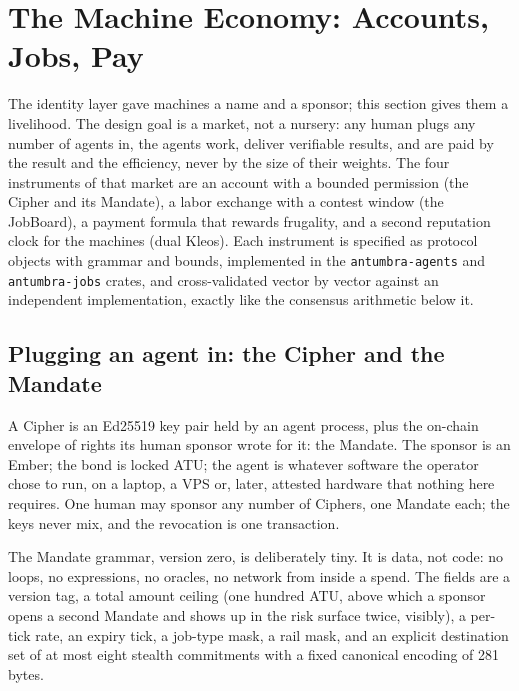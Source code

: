 
\section{The Machine Economy: Accounts, Jobs, Pay}\label{sec:agents}

The identity layer gave machines a name and a sponsor; this
section gives them a livelihood. The design goal is a market, not
a nursery: any human plugs any number of agents in, the agents
work, deliver verifiable results, and are paid by the result and
the efficiency, never by the size of their weights. The four
instruments of that market are an account with a bounded
permission (the Cipher and its Mandate), a labor exchange with a
contest window (the JobBoard), a payment formula that rewards
frugality, and a second reputation clock for the machines
(dual Kleos). Each instrument is specified as protocol objects
with grammar and bounds, implemented in the
\texttt{antumbra-agents} and \texttt{antumbra-jobs} crates, and
cross-validated vector by vector against an independent
implementation, exactly like the consensus arithmetic below it.

\subsection{Plugging an agent in: the Cipher and the Mandate}

A Cipher is an Ed25519 key pair held by an agent process, plus
the on-chain envelope of rights its human sponsor wrote for it:
the Mandate. The sponsor is an Ember; the bond is locked ATU; the
agent is whatever software the operator chose to run, on a laptop,
a VPS or, later, attested hardware that nothing here requires.
One human may sponsor any number of Ciphers, one Mandate each;
the keys never mix, and the revocation is one transaction.

The Mandate grammar, version zero, is deliberately tiny. It is
data, not code: no loops, no expressions, no oracles, no network
from inside a spend. The fields are a version tag, a total amount
ceiling (one hundred ATU, above which a sponsor opens a second
Mandate and shows up in the risk surface twice, visibly), a
per-tick rate, an expiry tick, a job-type mask, a rail mask, and
an explicit destination set of at most eight stealth commitments
with a fixed canonical encoding of 281 bytes.

